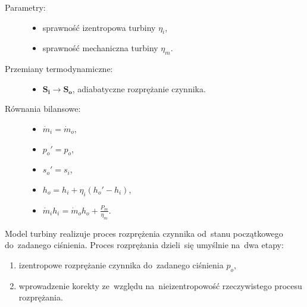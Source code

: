 \begin{description}

	\item[Parametry:] \hfill

		\begin{itemize}

			\item sprawność izentropowa turbiny $\eta_i$,

			\item sprawność mechaniczna turbiny $\eta_m$.

		\end{itemize}

	\item[Przemiany termodynamiczne:] \hfill

		\begin{itemize}

			\item $\mathbf{S_i} \rightarrow \mathbf{S_o}$,
				adiabatyczne rozprężanie czynnika.

		\end{itemize}

	\item[Równania bilansowe:] \hfill

		\begin{itemize}

			\item \eq$\dot m_i = \dot m_o$,

			\item \eq$p_o' = p_o$,%
				\label{turb.petla.p}

			\item \eq$s_o' = s_i$,%
				\label{turb.petla.s}

			\item \eq$h_o = h_i + \eta_i ( h_o' - h_i )$,%
				\label{turb.wyj.h}

			\item \eq$\dot m_i h_i = \dot m_o h_o + \frac{P_m}{\eta_m}$.

		\end{itemize}

\end{description}

Model turbiny realizuje proces rozprężenia czynnika od~stanu
początkowego do~zadanego ciśnienia. Proces rozprężania dzieli~się
umyślnie na~dwa etapy:

\begin{enumerate}

	\item izentropowe rozprężanie czynnika do~zadanego ciśnienia $p_o$,

	\item wprowadzenie korekty ze~względu na~nieizentropowość
		rzeczywistego procesu rozprężania.

\end{enumerate}

